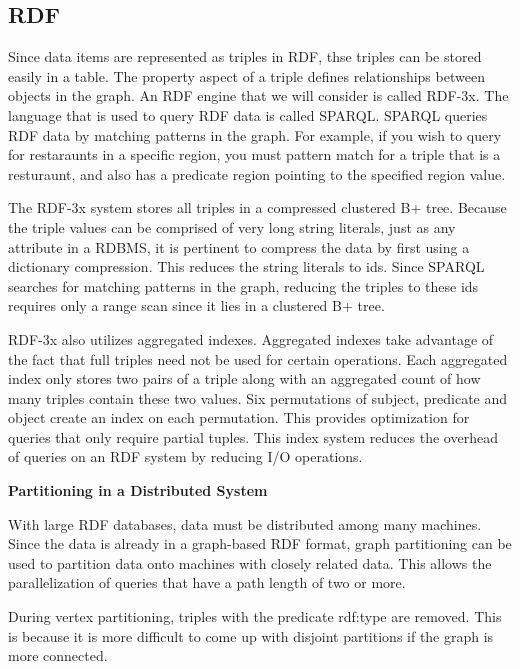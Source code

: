 \subsection*{RDF}


Since data items are represented as triples in RDF, thse triples can be stored easily in a table. The property aspect of a triple defines relationships between objects in the graph\cite{RDF}. An RDF engine that we will consider is called RDF-3x. 
The language that is used to query RDF data is called SPARQL. SPARQL queries RDF data by matching patterns in the graph. For example, if you wish to query for restaraunts in a specific region, you must pattern match for a triple that is a resturaunt, and also has a predicate region pointing to the specified region value.

The RDF-3x system stores all triples in a compressed clustered B+ tree\cite{RDF}. Because the triple values can be comprised of very long string literals, just as any attribute in a RDBMS, it is pertinent to compress the data by first using a dictionary compression. This reduces the string literals to ids. Since SPARQL searches for matching patterns in the graph, reducing the triples to these ids requires only a range scan since it lies in a clustered B+ tree.


RDF-3x also utilizes aggregated indexes. Aggregated indexes take advantage of the fact that full triples need not be used for certain operations. Each aggregated index only stores two pairs of a triple along with an aggregated count of how many triples contain these two values. Six permutations of subject, predicate and object create an index on each permutation\cite{RDF}. This provides optimization for queries that only require partial tuples. This index system reduces the overhead of queries on an RDF system by reducing I/O operations.

\par
\textbf{Partitioning in a Distributed System}
\par
With large RDF databases, data must be distributed among many machines. Since the data is already in a graph-based RDF format, graph partitioning can be used to partition data onto machines with closely related data. This allows the parallelization of queries that have a path length of two or more\cite{scalableRDF}. 


During vertex partitioning, triples with the predicate rdf:type are removed\cite{scalableRDF}. This is because it is more difficult to come up with disjoint partitions if the graph is more connected. 

